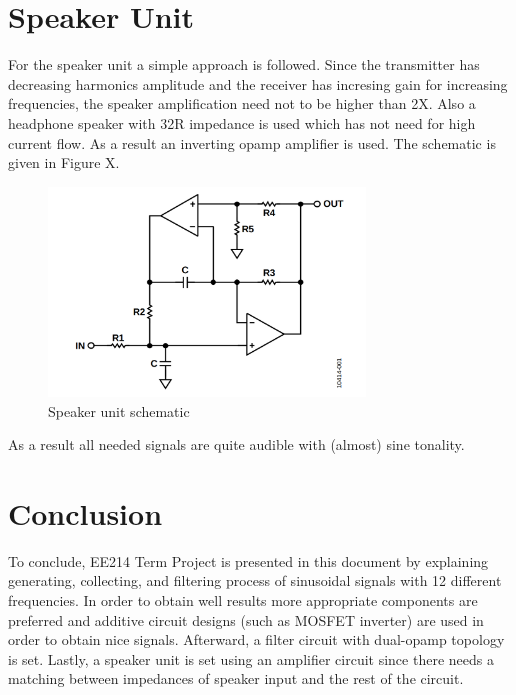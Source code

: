 \documentclass[letterpaper,12pt]{article}
\begin{document}
\section{Speaker Unit}
For the speaker unit a simple approach is followed. Since the transmitter has decreasing harmonics amplitude and the receiver has incresing gain for increasing frequencies, the speaker amplification need not to be  higher than 2X. Also a headphone speaker with 32R impedance is used which has not need for high current flow. As a result an inverting opamp amplifier is used. The schematic is given in Figure X.
\begin{figure}[H]
    \centering
    \includegraphics[width = 0.75\textwidth]{dualopamp.png}
    \caption{Speaker unit schematic}
\end{figure}
As a result all needed signals are quite audible with (almost) sine tonality. 

\section{Conclusion}
To conclude, EE214 Term Project is presented in this document by explaining generating, collecting, and filtering process of sinusoidal signals with 12 different frequencies. In order to obtain well results more appropriate components are preferred and additive circuit designs (such as MOSFET inverter) are used in order to obtain nice signals. Afterward, a filter circuit with dual-opamp topology is set. Lastly, a speaker unit is set using an amplifier circuit since there needs a matching between impedances of speaker input and the rest of the circuit.    
\end{document}
